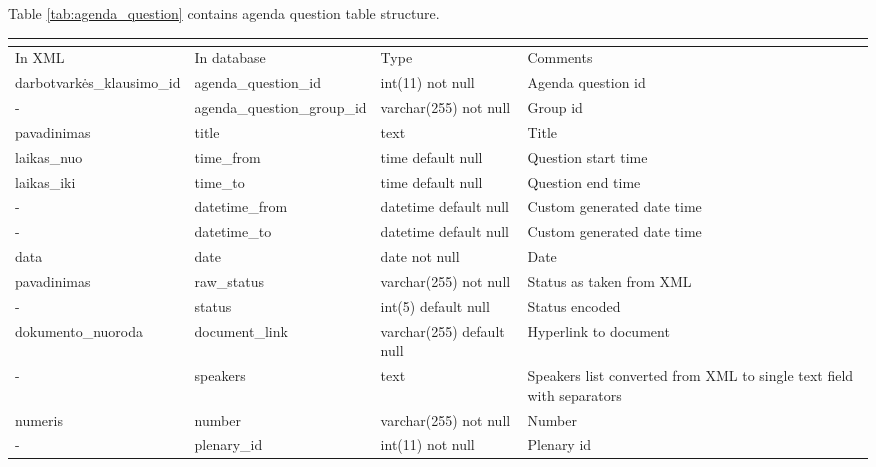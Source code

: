 \documentclass[a4paper,12pt]{article}
\begin{document}
	\noindent
	Table \ref{tab:agenda_question} contains agenda question table structure.
	\begin{center}
		 \label{tab:agenda_question}
		\begin{tabular}{L{3cm} L{4.2cm} L{3cm} L{2.5cm}}
			\\ 
			\hline
			In XML & In database & Type & Comments\\
			\hline
			darbotvarkės\_klausimo\_id & agenda\_question\_id & int(11) not null & Agenda question id\\
			- & agenda\_question\_group\_id & varchar(255) not null & Group id\\
			pavadinimas & title & text & Title \\
			laikas\_nuo & time\_from & time default null &  Question start time \\
			laikas\_iki & time\_to & time default null & Question end time \\
			- & datetime\_from & datetime default null & Custom generated date time \\
			- & datetime\_to & datetime default null & Custom generated date time\\
			data & date &  date not null & Date\\
			pavadinimas & raw\_status & varchar(255) not null & Status as taken from XML \\
			- & status & int(5) default null & Status encoded \\
			dokumento\_nuoroda & document\_link & varchar(255) default null & Hyperlink to document\\
			- & speakers & text & Speakers list converted from XML to single text field with separators \\
			numeris & number & varchar(255) not null & Number \\
			- & plenary\_id & int(11) not null & Plenary id\\			                                    
			\hline
		\end{tabular}
	\end{center}
	
	\clearpage
	
\end{document}
